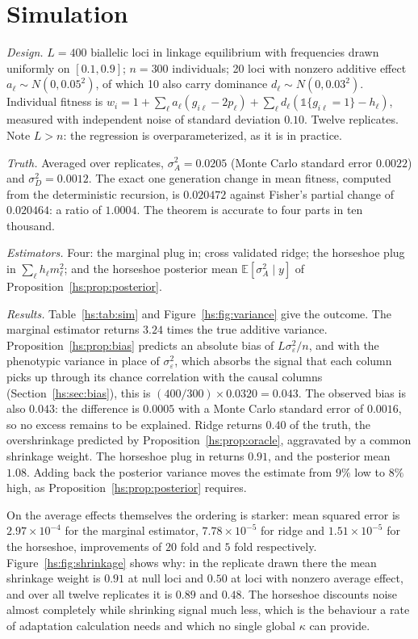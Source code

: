 \section{Simulation}
\label{hs:sec:sim}

\emph{Design.} $L = 400$ biallelic loci in linkage equilibrium with frequencies drawn uniformly on $[0.1,0.9]$; $n = 300$ individuals; 20 loci with nonzero additive effect $a_\ell \sim N(0,0.05^2)$, of which 10 also carry dominance $d_\ell \sim N(0,0.03^2)$. Individual fitness is $w_i = 1 + \sum_\ell a_\ell (g_{i\ell}-2p_\ell) + \sum_\ell d_\ell(\mathbb{1}\{g_{i\ell}=1\} - h_\ell)$, measured with independent noise of standard deviation $0.10$. Twelve replicates. Note $L > n$: the regression is overparameterized, as it is in practice.

\emph{Truth.} Averaged over replicates, $\sigma^2_A = 0.0205$ (Monte Carlo standard error $0.0022$) and $\sigma^2_D = 0.0012$. The exact one generation change in mean fitness, computed from the deterministic recursion, is $0.020472$ against Fisher's partial change of $0.020464$: a ratio of $1.0004$. The theorem is accurate to four parts in ten thousand.

\emph{Estimators.} Four: the marginal plug in; cross validated ridge; the horseshoe plug in $\sum_\ell h_\ell m_\ell^2$; and the horseshoe posterior mean $\mathbb{E}[\sigma^2_A\mid y]$ of Proposition~\ref{hs:prop:posterior}.

\emph{Results.} Table~\ref{hs:tab:sim} and Figure~\ref{hs:fig:variance} give the outcome. The marginal estimator returns $3.24$ times the true additive variance. Proposition~\ref{hs:prop:bias} predicts an absolute bias of $L\sigma^2_\varepsilon/n$, and with the phenotypic variance in place of $\sigma^2_\varepsilon$, which absorbs the signal that each column picks up through its chance correlation with the causal columns (Section~\ref{hs:sec:bias}), this is $(400/300)\times 0.0320 = 0.043$. The observed bias is also $0.043$: the difference is $0.0005$ with a Monte Carlo standard error of $0.0016$, so no excess remains to be explained. Ridge returns $0.40$ of the truth, the overshrinkage predicted by Proposition~\ref{hs:prop:oracle}, aggravated by a common shrinkage weight. The horseshoe plug in returns $0.91$, and the posterior mean $1.08$. Adding back the posterior variance moves the estimate from $9\%$ low to $8\%$ high, as Proposition~\ref{hs:prop:posterior} requires.

On the average effects themselves the ordering is starker: mean squared error is $2.97\times10^{-4}$ for the marginal estimator, $7.78\times10^{-5}$ for ridge and $1.51\times10^{-5}$ for the horseshoe, improvements of $20$ fold and $5$ fold respectively. Figure~\ref{hs:fig:shrinkage} shows why: in the replicate drawn there the mean shrinkage weight is $0.91$ at null loci and $0.50$ at loci with nonzero average effect, and over all twelve replicates it is $0.89$ and $0.48$. The horseshoe discounts noise almost completely while shrinking signal much less, which is the behaviour a rate of adaptation calculation needs and which no single global $\kappa$ can provide.

